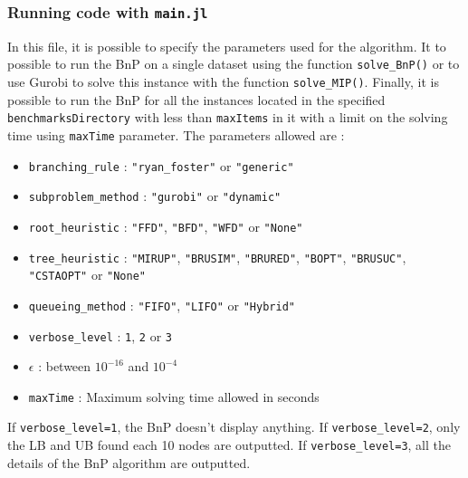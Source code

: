 \subsubsection{Running code with \texttt{main.jl}}
In this file, it is possible to specify the parameters used for the algorithm. It to possible to run the BnP on a single dataset using the function \texttt{solve\_BnP()} or to use Gurobi to solve this instance with the function \texttt{solve\_MIP()}. Finally, it is possible to run the BnP for all the instances located in the specified \texttt{benchmarksDirectory} with less than \texttt{maxItems} in it with a limit on the solving time using \texttt{maxTime} parameter. The parameters allowed are :
\begin{itemize}
	\item \texttt{branching\_rule} : \texttt{"ryan\_foster"} or \texttt{"generic"}
	\item \texttt{subproblem\_method} : \texttt{"gurobi"} or \texttt{"dynamic"}
	\item \texttt{root\_heuristic} : \texttt{"FFD"}, \texttt{"BFD"}, \texttt{"WFD"} or \texttt{"None"}
	\item \texttt{tree\_heuristic} : \texttt{"MIRUP"}, \texttt{"BRUSIM"}, \texttt{"BRURED"}, \texttt{"BOPT"}, \texttt{"BRUSUC"}, \texttt{"CSTAOPT"} or \texttt{"None"}
	\item \texttt{queueing\_method} : \texttt{"FIFO"}, \texttt{"LIFO"} or \texttt{"Hybrid"}
	\item \texttt{verbose\_level} : \texttt{1}, \texttt{2} or \texttt{3}
	\item \texttt{$\epsilon$} : between $10^{-16}$ and $10^{-4}$
	\item \texttt{maxTime} : Maximum solving time allowed in seconds
\end{itemize}
If \texttt{verbose\_level=1}, the BnP doesn't display anything. If \texttt{verbose\_level=2}, only the LB and UB found each 10 nodes are outputted. If \texttt{verbose\_level=3}, all the details of the BnP algorithm are outputted.